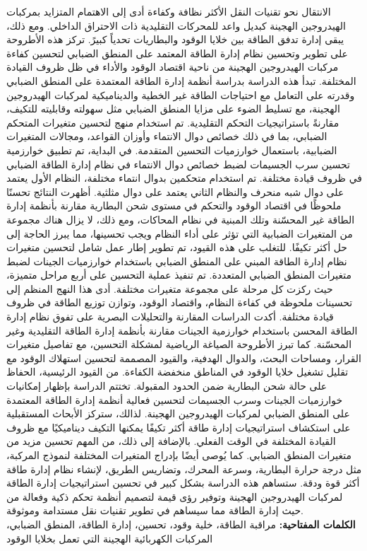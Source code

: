 \begin{Arabic}
الانتقال نحو تقنيات النقل الأكثر نظافة وكفاءة أدى إلى الاهتمام المتزايد بمركبات الهيدروجين الهجينة   كبديل واعد للمحركات التقليدية ذات الاحتراق الداخلي. ومع ذلك، يبقى إدارة تدفق الطاقة بين خلايا الوقود والبطاريات تحدياً كبيرً. تركز هذه الأطروحة على تطوير وتحسين نظام إدارة الطاقة المعتمد على المنطق الضبابي لتحسين كفاءة مركبات الهيدروجين الهجينة من ناحية اقتصاد الوقود والأداء في ظل ظروف القيادة المختلفة. تبدأ هذه الدراسة بدراسة أنظمة إدارة الطاقة المعتمدة على المنطق الضبابي وقدرته على التعامل مع احتياجات الطاقة غير الخطية والديناميكية لمركبات الهيدروجين الهجينة، مع تسليط الضوء على مزايا المنطق الضبابي مثل سهولته وقابليته للتكيف، مقارنةً باستراتيجيات التحكم التقليدية. تم استخدام منهج لتحسين متغيرات المتحكم الضبابي، بما في ذلك خصائص دوال الانتماء وأوزان القواعد، ومجالات المتغيرات الضبابية، باستعمال خوارزميات التحسين المتقدمة.  في البداية، تم تطبيق خوارزمية تحسين سرب الجسيمات لضبط خصائص دوال الانتماء في نظام إدارة الطاقة الضبابي في ظروف قيادة مختلفة. تم استخدام متحكمين بدوال انتماء مختلفة، النظام الأول يعتمد على دوال شبه منحرف والنظام الثاني يعتمد على دوال مثلثية. أظهرت النتائج تحسنًا ملحوظًا في اقتصاد الوقود والتحكم في مستوى شحن البطارية مقارنة بأنظمة إدارة الطاقة غير المحسّنة وتلك المبنية في نظام المحاكات، ومع ذلك، لا يزال هناك مجموعة من المتغيرات الضبابية التي تؤثر على أداء النظام ويجب تحسينها، مما يبرز الحاجة إلى حل أكثر تكيفًا. للتغلب على هذه القيود، تم تطوير إطار عمل شامل لتحسين متغيرات نظام إدارة الطاقة المبني على المنطق الضبابي باستخدام خوارزميات الجينات لضبط متغيرات المنطق الضبابي المتعددة. تم تنفيذ عملية التحسين على أربع مراحل متميزة، حيث ركزت كل مرحلة على مجموعة متغيرات مختلفة. أدى هذا النهج المنظم إلى تحسينات ملحوظة في كفاءة النظام، واقتصاد الوقود، وتوازن توزيع الطاقة في ظروف قيادة مختلفة. أكدت الدراسات المقارنة والتحليلات البصرية على تفوق نظام إدارة الطاقة المحسن باستخدام خوارزمية الجينات مقارنة بأنظمة إدارة الطاقة التقليدية وغير المحسّنة. كما تبرز الأطروحة الصياغة الرياضية لمشكلة التحسين، مع تفاصيل متغيرات القرار، ومساحات البحث، والدوال الهدفية، والقيود المصممة لتحسين استهلاك الوقود مع تقليل تشغيل خلايا الوقود في المناطق منخفضة الكفاءة. من القيود الرئيسية، الحفاظ على حالة شحن البطارية ضمن الحدود المقبولة. تختتم الدراسة بإظهار إمكانيات خوارزميات الجينات وسرب الجسيمات لتحسين فعالية أنظمة إدارة الطاقة المعتمدة على المنطق الضبابي لمركبات الهيدروجين الهجينة. لذالك، ستركز الأبحاث المستقبلية على استكشاف استراتيجيات إدارة طاقة أكثر تكيفًا يمكنها التكيف ديناميكيًا مع ظروف القيادة المختلفة في الوقت الفعلي. بالإضافة إلى ذلك، من المهم تحسين مزيد من متغيرات المنطق الضبابي. كما يُوصى أيضًا بإدراج المتغيرات المختلفة لنموذج المركبة، مثل درجة حرارة البطارية، وسرعة المحرك، وتضاريس الطريق، لإنشاء نظام إدارة طاقة أكثر قوة ودقة. ستساهم هذه الدراسة بشكل كبير في تحسين استراتيجيات إدارة الطاقة لمركبات الهيدروجين الهجينة وتوفير رؤى قيمة لتصميم أنظمة تحكم ذكية وفعالة من حيث إدارة الطاقة مما سيساهم في تطوير تقنيات نقل مستدامة وموثوقة. \\
\textbf{الكلمات المفتاحية:} مراقبة الطاقة، خلية وقود، تحسين، إدارة الطاقة، المنطق الضبابي، المركبات الكهربائية الهجينة التي تعمل بخلايا الوقود 
	\end{Arabic}



